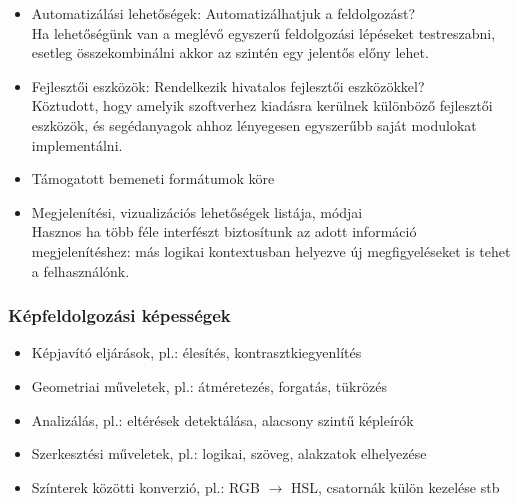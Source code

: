 \documentclass[a4paper,12pt,oneside]{report}
\begin{document}
\begin{itemize}
	\item Automatizálási lehetőségek: Automatizálhatjuk a feldolgozást?\\Ha lehetőségünk van a meglévő egyszerű feldolgozási lépéseket testreszabni, esetleg összekombinálni akkor az szintén egy jelentős előny lehet.
	\item Fejlesztői eszközök: Rendelkezik hivatalos fejlesztői eszközökkel?\\Köztudott, hogy amelyik szoftverhez kiadásra kerülnek különböző fejlesztői eszközök, és segédanyagok ahhoz lényegesen egyszerűbb saját modulokat implementálni.
	\item Támogatott bemeneti formátumok köre
	\item Megjelenítési, vizualizációs lehetőségek listája, módjai\\Hasznos ha több féle interfészt biztosítunk az adott információ megjelenítéshez: más logikai kontextusban helyezve új megfigyeléseket is tehet a felhasználónk.

\end{itemize}


\subsubsection{Képfeldolgozási képességek}
\begin{itemize}
	\itemsep0em
	\item Képjavító eljárások, pl.: élesítés, kontrasztkiegyenlítés
	\item Geometriai műveletek, pl.: átméretezés, forgatás, tükrözés
	\item Analizálás, pl.: eltérések detektálása, alacsony szintű képleírók
	\item Szerkesztési műveletek, pl.: logikai, szöveg, alakzatok elhelyezése
	\item Színterek közötti konverzió, pl.: RGB $\rightarrow $ HSL, csatornák külön kezelése stb

\end{itemize}
\end{document}
